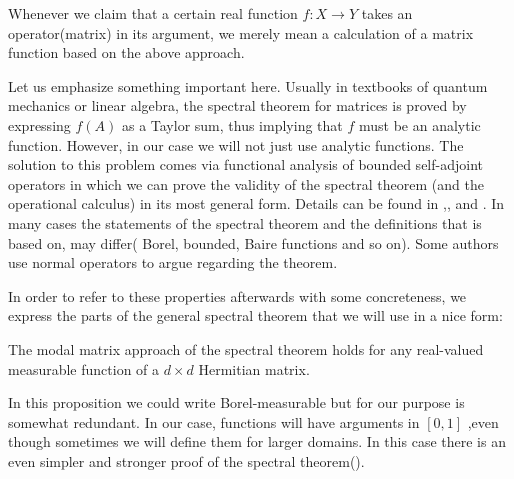 \begin{note}
Whenever we claim that a certain real function $f:X\rightarrow Y$ takes an operator(matrix) in its argument, we merely mean a calculation of a matrix function based on the above approach.
\end{note}
\par
Let us emphasize something important here. Usually in textbooks of quantum mechanics or linear algebra, the spectral theorem for matrices is proved by expressing $f(A)$ as a Taylor sum, thus implying that $f$ must be an analytic function. However, in our case we will not just use analytic functions. The solution to this problem comes via functional analysis of bounded self-adjoint operators in which we can prove the validity of the spectral theorem (and the operational calculus) in its most general form. Details can be found in \cite{hall2013quantum},\cite{yosida1988functional},\cite{reed1980methods} and \cite{sternberg2019mathematical}. In many cases the statements of the spectral theorem and the definitions that is based on, may differ( Borel, bounded, Baire functions and so on). Some authors use normal operators to argue regarding the theorem. 
\par
In order to refer to these properties afterwards with some concreteness, we express the parts of the general spectral theorem that we will use in a nice form:
\begin{proposition}
The modal matrix approach of the spectral theorem holds for any real-valued measurable function of a $d \times d$  Hermitian matrix.
\label{spectraltheorem}
\end{proposition}
\noindent
In this proposition we could write Borel-measurable but for our purpose is somewhat redundant. In our case, functions will have arguments in $[0,1]$ ,even though sometimes we will define them for larger domains. In this case there is an even simpler and stronger proof of the spectral theorem(\citep{hall2013quantum}).
